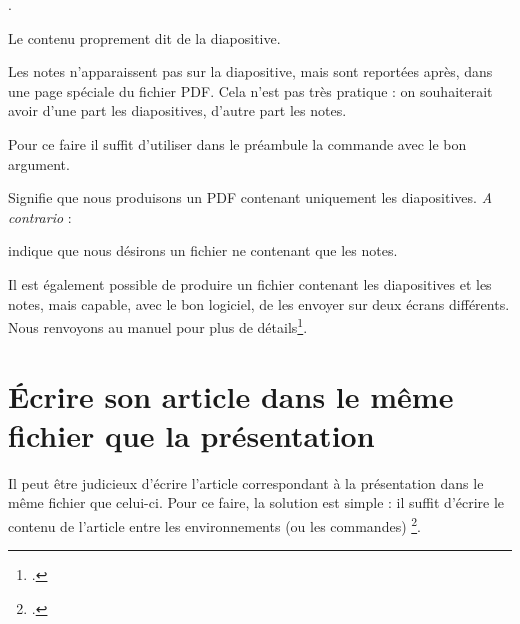 \begin{latexcode}
\begin{frame}
.
	
Le contenu proprement dit de la diapositive.
\end{frame}
\end{latexcode}


Les notes n'apparaissent pas sur la diapositive, mais sont reportées après, dans une page spéciale du fichier PDF. Cela n'est pas très pratique : on souhaiterait avoir d'une part les diapositives, d'autre part les notes. 

Pour ce faire il suffit d'utiliser dans le préambule la commande  avec le bon argument.

\begin{latexcode}
\end{latexcode}

Signifie que nous produisons un PDF contenant uniquement les diapositives. \emph{A contrario} :
\begin{latexcode}
\end{latexcode}
indique que nous désirons un fichier ne contenant que les notes.

Il est également possible de produire un fichier contenant les diapositives et les notes, mais capable, avec le bon logiciel, de les envoyer sur deux écrans différents. Nous renvoyons au manuel pour plus de détails\footcite{beamer_2ecrans}.

\section{Écrire son article dans le même fichier que la présentation}

Il peut être judicieux d'écrire l'article correspondant à la présentation dans le même fichier que celui-ci. Pour ce faire, la solution est  simple : il suffit d'écrire le contenu de l'article entre les environnements (ou les commandes) \footcites[À noter qu'on peut aussi introduire des miniatures des diapositives  dans l'article, voir :][]{beamer_diapo_article}.

